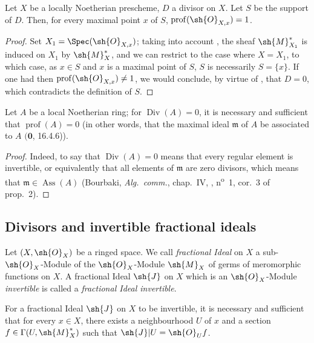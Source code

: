 \begin{corollary}[21.1.9]
\label{IV.21.1.9}
Let $X$ be a locally Noetherian prescheme, $D$ a divisor on $X$.
Let $S$ be the support of $D$.
Then, for every maximal point $x$ of $S$, $\operatorname{prof}(\sh{O}_{X,x})=1$.
\end{corollary}

\begin{proof}
Set $X_1=\Spec(\sh{O}_{X,x})$;
taking into account , the sheaf $\sh{M}_{X_1}^*$ is induced on $X_1$ by $\sh{M}_X^*$, and we can restrict to the case where $X=X_1$, to which case, as $x\in S$ and $x$ is a maximal point of $S$, $S$ is necessarily $S=\{x\}$.
If one had then $\operatorname{prof}(\sh{O}_{X,x})\neq 1$, we would conclude, by virtue of , that $D=0$, which contradicts the definition of $S$.
\end{proof}

\begin{proposition}[21.1.10]
\label{IV.21.1.10}
Let $A$ be a local Noetherian ring;
for $\operatorname{Div}(A)=0$, it is necessary and sufficient that $\operatorname{prof}(A)=0$ (in other words, that the maximal ideal $\mathfrak{m}$ of $A$ be associated to $A$ $(\mathbf{0}$, 16.4.6)).
\end{proposition}

\begin{proof}
Indeed, to say that $\operatorname{Div}(A)=0$ means that every regular element is invertible, or equivalently that all elements of $\mathfrak{m}$ are zero divisors, which means that $\mathfrak{m}\in\operatorname{Ass}(A)$ (Bourbaki, \emph{Alg.~comm.}, chap.~IV, , n\textsuperscript{o}~1, cor.~3 of prop.~2).
\end{proof}

\subsection{Divisors and invertible fractional ideals}
\label{IV.21.2}

\begin{env}[21.2.1]
\label{IV.21.2.1}
Let $(X,\sh{O}_X)$ be a ringed space.
We call \emph{fractional Ideal} on $X$ a sub-$\sh{O}_X$-Module of the $\sh{O}_X$-Module $\sh{M}_X$ of germs of meromorphic functions on $X$.
A fractional Ideal $\sh{J}$ on $X$ which is an $\sh{O}_X$-Module \emph{invertible} is called a \emph{fractional Ideal invertible}.
\end{env}

\begin{proposition}[21.2.2]
\label{IV.21.2.2}
For a fractional Ideal $\sh{J}$ on $X$ to be invertible, it is necessary and sufficient that for every $x\in X$, there exists a neighbourhood $U$ of $x$ and a section $f\in\Gamma(U,\sh{M}_X^*)$ such that $\sh{J}|U=\sh{O}_U f$.
\end{proposition}

